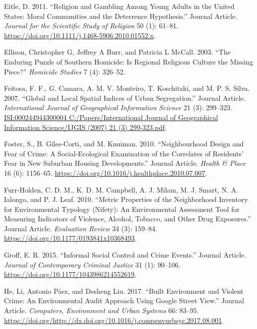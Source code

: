 \documentclass[smallextended]{svjour3}       %
\begin{document}
\leavevmode\hypertarget{ref-Eitle2011religion}{}%
Eitle, D. 2011. ``Religion and Gambling Among Young Adults in the United
States: Moral Communities and the Deterrence Hypothesis.'' Journal
Article. \emph{Journal for the Scientific Study of Religion} 50 (1):
61--81. \url{https://doi.org/10.1111/j.1468-5906.2010.01552.x}.

\leavevmode\hypertarget{ref-Ellison2003enduring}{}%
Ellison, Christopher G, Jeffrey A Burr, and Patricia L McCall. 2003.
``The Enduring Puzzle of Southern Homicide: Is Regional Religious
Culture the Missing Piece?'' \emph{Homicide Studies} 7 (4): 326--52.

\leavevmode\hypertarget{ref-Feitosa2007global}{}%
Feitosa, F. F., G. Camara, A. M. V. Monteiro, T. Koschitzki, and M. P.
S. Silva. 2007. ``Global and Local Spatial Indices of Urban
Segregation.'' Journal Article. \emph{International Journal of
Geographical Information Science} 21 (3): 299--323.
\href{ISI:000244944300004\%0AC:/Papers/International\%20Journal\%20of\%20Geographical\%20Information\%20Science/IJGIS\%20(2007)\%2021\%20(3)\%20299-323.pdf}{ISI:000244944300004
C:/Papers/International Journal of Geographical Information Science/IJGIS (2007) 21 (3) 299-323.pdf}.

\leavevmode\hypertarget{ref-Foster2010neighbourhood}{}%
Foster, S., B. Giles-Corti, and M. Knuiman. 2010. ``Neighbourhood Design
and Fear of Crime: A Social-Ecological Examination of the Correlates of
Residents' Fear in New Suburban Housing Developments.'' Journal Article.
\emph{Health \& Place} 16 (6): 1156--65.
\url{https://doi.org/10.1016/j.healthplace.2010.07.007}.

\leavevmode\hypertarget{ref-Furr2010metric}{}%
Furr-Holden, C. D. M., K. D. M. Campbell, A. J. Milam, M. J. Smart, N.
A. Ialongo, and P. J. Leaf. 2010. ``Metric Properties of the
Neighborhood Inventory for Environmental Typology (Nifety): An
Environmental Assessment Tool for Measuring Indicators of Violence,
Alcohol, Tobacco, and Other Drug Exposures.'' Journal Article.
\emph{Evaluation Review} 34 (3): 159--84.
\url{https://doi.org/10.1177/0193841x10368493}.

\leavevmode\hypertarget{ref-Groff2015informal}{}%
Groff, E. R. 2015. ``Informal Social Control and Crime Events.'' Journal
Article. \emph{Journal of Contemporary Criminal Justice} 31 (1):
90--106. \url{https://doi.org/10.1177/1043986214552619}.

\leavevmode\hypertarget{ref-He2017built}{}%
He, Li, Antonio Páez, and Desheng Liu. 2017. ``Built Environment and
Violent Crime: An Environmental Audit Approach Using Google Street
View.'' Journal Article. \emph{Computers, Environment and Urban Systems}
66: 83--95.
\url{https://doi.org/http://dx.doi.org/10.1016/j.compenvurbsys.2017.08.001}.
\end{document}
